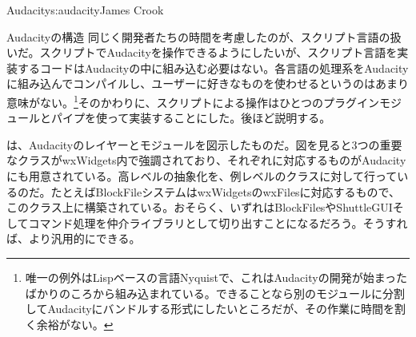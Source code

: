 \begin{aosachapter}{Audacity}{s:audacity}{James Crook}
\begin{aosasect1}{Audacityの構造}
同じく開発者たちの時間を考慮したのが、スクリプト言語の扱いだ。スクリプトでAudacityを操作できるようにしたいが、スクリプト言語を実装するコードはAudacityの中に組み込む必要はない。各言語の処理系をAudacityに組み込んでコンパイルし、ユーザーに好きなものを使わせるというのはあまり意味がない。\footnote{唯一の例外はLispベースの言語Nyquistで、これはAudacityの開発が始まったばかりのころから組み込まれている。できることなら別のモジュールに分割してAudacityにバンドルする形式にしたいところだが、その作業に時間を割く余裕がない。}そのかわりに、スクリプトによる操作はひとつのプラグインモジュールとパイプを使って実装することにした。後ほど説明する。


は、Audacityのレイヤーとモジュールを図示したものだ。図を見ると3つの重要なクラスがwxWidgets内で強調されており、それぞれに対応するものがAudacityにも用意されている。高レベルの抽象化を、例レベルのクラスに対して行っているのだ。たとえばBlockFileシステムはwxWidgetsのwxFilesに対応するもので、このクラス上に構築されている。おそらく、いずれはBlockFilesやShuttleGUIそしてコマンド処理を仲介ライブラリとして切り出すことになるだろう。そうすれば、より汎用的にできる。


\end{aosasect1}
\end{aosachapter}
